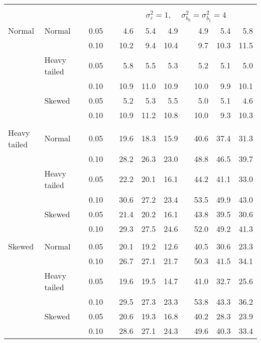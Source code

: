 \begin{table}[ht]
\begin{scriptsize}
\begin{center}
\begin{tabular}{ll p{.1cm} c p{.1cm} rrr p{.1cm} rrr}
&&&&&&&&&&&\\
& && && \multicolumn{7}{c}{$\sigma_{\varepsilon}^2 = 1$, \ \ $\sigma_{b_0}^2 = \sigma_{b_1}^2 = 4$} \\ \cline{6-12}
\rowcolor{gray!20}Normal       & Normal       && 0.05 &&   4.6 & 5.4 & 4.9 &   & 4.9 & 5.4 & 5.8 \\ 
\rowcolor{gray!20}             &              && 0.10 &&   10.2 & 9.4 & 10.4 &   & 9.7 & 10.3 & 11.5 \\ 
\rowcolor{gray!20}             & Heavy tailed && 0.05 &&   5.8 & 5.5 & 5.3 &   & 5.2 & 5.1 & 5.0 \\ 
\rowcolor{gray!20}             &              && 0.10 &&   10.9 & 11.0 & 10.9 &   & 10.0 & 9.9 & 10.1 \\ 
\rowcolor{gray!20}             & Skewed       && 0.05 &&   5.2 & 5.3 & 5.5 &   & 5.0 & 5.1 & 4.6 \\ 
\rowcolor{gray!20}             &              && 0.10 &&   10.9 & 11.2 & 10.8 &   & 10.0 & 9.3 & 10.3 \\ 
&&&&&&&&&&&\\
Heavy tailed & Normal       && 0.05 &&   19.6 & 18.3 & 15.9 &   & 40.6 & 37.4 & 31.3 \\ 
             &              && 0.10 &&   28.2 & 26.3 & 23.0 &   & 48.8 & 46.5 & 39.7 \\ 
             & Heavy tailed && 0.05 &&   22.2 & 20.1 & 16.1 &   & 44.2 & 41.1 & 33.0 \\ 
             &              && 0.10 &&   30.6 & 27.2 & 23.4 &   & 53.5 & 49.9 & 43.0 \\ 
             & Skewed       && 0.05 &&   21.4 & 20.2 & 16.1 &   & 43.8 & 39.5 & 30.6 \\ 
             &              && 0.10 &&   29.3 & 27.5 & 24.6 &   & 52.0 & 49.2 & 41.3 \\ 
&&&&&&&&&&&\\
Skewed       & Normal       && 0.05 &&   20.1 & 19.2 & 12.6 &   & 40.5 & 30.6 & 23.3 \\ 
             &              && 0.10 &&   26.7 & 27.1 & 21.7 &   & 50.3 & 41.5 & 34.1 \\ 
             & Heavy tailed && 0.05 &&   19.6 & 19.5 & 14.7 &   & 41.0 & 32.7 & 25.6 \\ 
             &              && 0.10 &&   29.5 & 27.3 & 23.3 &   & 53.8 & 43.3 & 36.2 \\ 
             & Skewed       && 0.05 &&   20.6 & 19.3 & 16.8 &   & 40.2 & 28.3 & 23.9 \\ 
             &              && 0.10 &&   28.6 & 27.1 & 24.3 &   & 49.6 & 40.3 & 33.4 \\ 

\hline
\end{tabular}
\end{center}
\end{scriptsize}
\end{table}

